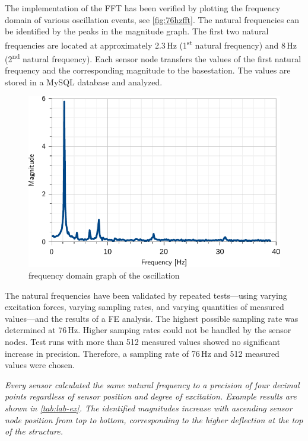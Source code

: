 \documentclass[12pt,a4paper]{scrartcl}
\begin{document}
The implementation of the FFT has been verified by plotting the frequency domain of various oscillation events, see \autoref{fig:76hzfft}.
The natural frequencies can be identified by the peaks in the magnitude graph.
The first two natural frequencies are located at approximately 2.3\,Hz (1\textsuperscript{st} natural frequency) and 8\,Hz (2\textsuperscript{nd} natural frequency).
Each sensor node transfers the values of the first natural frequency and the corresponding magnitude to the basestation. 
The values are stored in a MySQL database and analyzed.

\begin{figure}[htb]
    \centering
    \includegraphics[scale=0.9]{figures/76HzHalf.pdf}
    \caption{frequency domain graph of the oscillation}
    \label{fig:76hzfft}
\end{figure}

The natural frequencies have been validated by repeated tests---using varying excitation forces, varying sampling rates, and varying quantities of measured values---and the results of a FE analysis.
The highest possible sampling rate was determined at 76\,Hz.
Higher samping rates could not be handled by the sensor nodes.
Test runs with more than 512 measured values showed no significant increase in precision.
Therefore, a sampling rate of 76\,Hz and 512 measured values were chosen.

\textit{Every sensor calculated the same natural frequency to a precision of four decimal points regardless of sensor position and degree of excitation.
Example results are shown in \autoref{tab:lab-ex}.
The identified magnitudes increase with ascending sensor node position from top to bottom, corresponding to the higher deflection at the top of the structure.}
\end{document}
